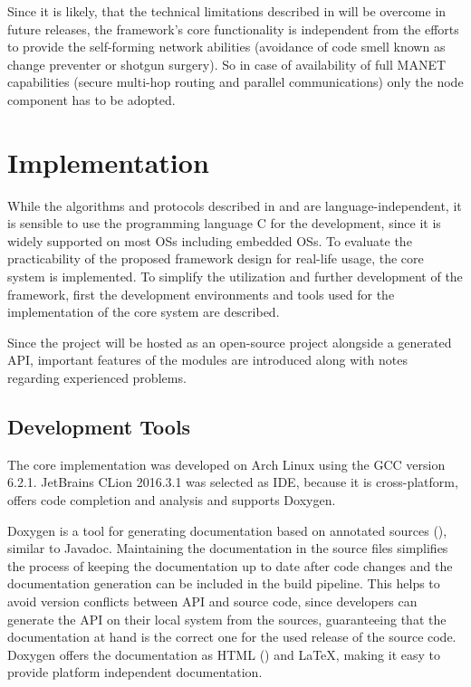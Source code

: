 Since it is likely, that the technical limitations described in  will be overcome in future releases, the framework's core functionality is independent from the efforts to provide the self-forming network abilities (avoidance of code smell known as change preventer or shotgun surgery). So in case of availability of full \gls{MANET} capabilities (secure multi-hop routing and parallel communications) only the node component has to be adopted.



\chapter{Implementation} \label{Implementation}


While the algorithms and protocols described in  and  are language-independent, it is sensible to use the programming language C for the development, since it is widely supported on most \glspl{OS} including embedded \glspl{OS}. 
To evaluate the practicability of the proposed framework design for real-life usage, the core system is implemented.
To simplify the utilization and further development of the framework, first the development environments and tools used for the implementation of the core system are described.

Since the project will be hosted as an open-source project alongside a generated \gls{API}, important features of the modules are introduced along with notes regarding experienced problems.

\section{Development Tools}	\label{Development Tools}

The core implementation was developed on Arch Linux using the \gls{GCC} version 6.2.1. JetBrains CLion 2016.3.1 was selected as \gls{IDE}, because it is cross-platform, offers code completion and analysis and supports Doxygen.

Doxygen is a tool for generating documentation based on annotated sources (), similar to Javadoc. Maintaining the documentation in the source files simplifies the process of keeping the documentation up to date after code changes and the documentation generation can be included in the build pipeline. This helps to avoid version conflicts between \gls{API} and source code, since developers can generate the \gls{API} on their local system from the sources, guaranteeing that the documentation at hand is the correct one for the used release of the source code. Doxygen offers the documentation as \gls{HTML} () and LaTeX, making it easy to provide platform independent documentation.

